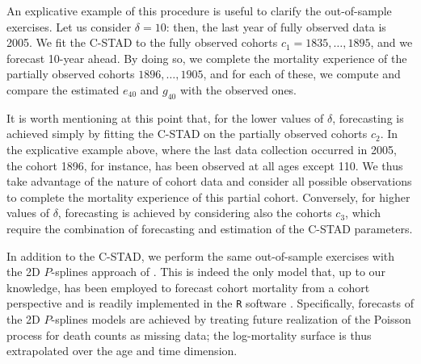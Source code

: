 \documentclass[11pt, a4paper]{article}
\begin{document}

An explicative example of this procedure is useful to clarify the out-of-sample exercises. Let us consider $\delta=10$: then, the last year of fully observed data is 2005. We fit the C-STAD to the fully observed cohorts $c_1=1835,\ldots,1895$, and we forecast 10-year ahead. By doing so, we complete the mortality experience of the partially observed cohorts $1896,\ldots,1905$, and for each of these, we compute and compare the estimated $e_{40}$ and $g_{40}$ with the observed ones. 


It is worth mentioning at this point that, for the lower values of $\delta$, forecasting is achieved simply by fitting the C-STAD on the partially observed cohorts $c_2$. In the explicative example above, where the last data collection occurred in 2005, the cohort 1896, for instance, has been observed at all ages except 110. We thus take advantage of the nature of cohort data and consider all possible observations to complete the mortality experience of this partial cohort.  Conversely, for higher values of $\delta$, forecasting is achieved by considering also the cohorts $c_3$, which require the combination of forecasting and estimation of the C-STAD parameters. 

In addition to the C-STAD, we perform the same out-of-sample exercises with the 2D $P$-splines approach of \cite{currie2004smoothing}. This is indeed the only model that, up to our knowledge, has been employed to forecast cohort mortality from a cohort perspective \citep{cmi2007stochastic} and is readily implemented in the \texttt{R} software \cite[in the \texttt{MortalitySmooth} package,][]{camarda2012mortalitysmooth}. Specifically, forecasts of the 2D $P$-splines models are achieved by treating future realization of the Poisson process for death counts as missing data; the log-mortality surface is thus extrapolated over the age and time dimension. 
\end{document}
